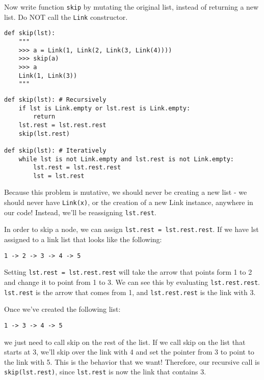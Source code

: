 \begin{blocksection}
\question Now write function \texttt{skip} by mutating the original list, instead of returning a new list. Do NOT call the \texttt{Link} constructor.

\begin{lstlisting}
def skip(lst):
    """
    >>> a = Link(1, Link(2, Link(3, Link(4))))
    >>> skip(a)
    >>> a
    Link(1, Link(3))
    """
\end{lstlisting}

\begin{solution}[0in]
\begin{lstlisting}
def skip(lst): # Recursively
    if lst is Link.empty or lst.rest is Link.empty:
        return
    lst.rest = lst.rest.rest
    skip(lst.rest)

def skip(lst): # Iteratively
    while lst is not Link.empty and lst.rest is not Link.empty:
        lst.rest = lst.rest.rest
        lst = lst.rest
\end{lstlisting}
Because this problem is mutative, we should never be creating a new list - we should never have \lstinline{Link(x)}, or the creation of a new Link instance, anywhere in our code! Instead, we’ll be reassigning \lstinline{lst.rest}.

In order to skip a node, we can assign \lstinline{lst.rest = lst.rest.rest}. If we have lst assigned to a link list that looks like the following:
\begin{lstlisting}
1 -> 2 -> 3 -> 4 -> 5
\end{lstlisting}
Setting \lstinline{lst.rest = lst.rest.rest} will take the arrow that points form 1 to 2 and change it to point from 1 to 3. We can see this by evaluating \lstinline{lst.rest.rest}. \lstinline{lst.rest} is the arrow that comes from 1, and \lstinline{lst.rest.rest} is the link with 3.

Once we’ve created the following list:
\begin{lstlisting}
1 -> 3 -> 4 -> 5
\end{lstlisting}
we just need to call skip on the rest of the list. If we call skip on the list that starts at 3, we’ll skip over the link with 4 and set the pointer from 3 to point to the link with 5. This is the behavior that we want! Therefore, our recursive call is \lstinline{skip(lst.rest)}, since \lstinline{lst.rest} is now the link that contains 3.

\end{solution}
\end{blocksection}

